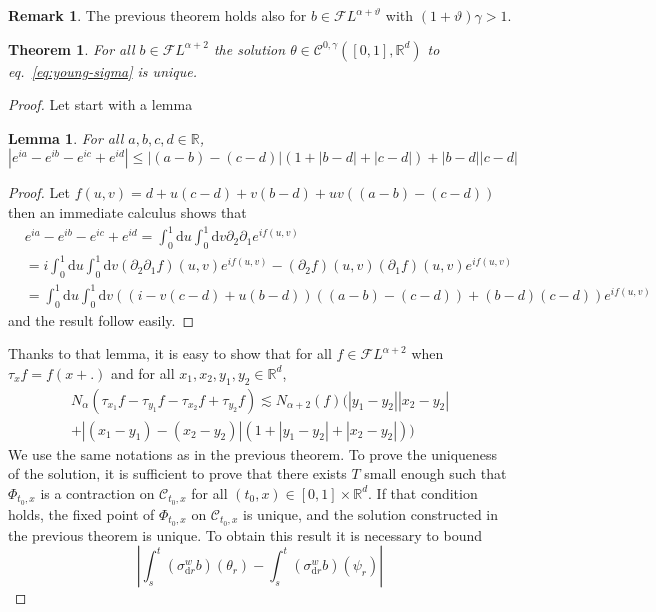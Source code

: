 \documentclass[11pt,a4paper,draft,reqno]{amsart}
\newtheorem{lemma}{Lemma}
\newtheorem{theorem}{Theorem}
\theoremstyle{definition}
\newtheorem{remark}{Remark}
\newcommand{\RR}{\mathbb{R}}
\newcommand{\cF}{\mathcal{F}}
\newcommand{\dd}{\mathrm{d}}
\newcommand{\cC}{\mathcal{C}}
\begin{document}
%
\begin{remark}
The previous theorem holds also for $b \in \cF L^{\alpha+\vartheta}$ with $(1+\vartheta)\gamma > 1$.
\end{remark}
%
\begin{theorem}
For all $b\in\cF L^{\alpha+2}$ the solution $\theta\in \cC^{0,\gamma}([0,1],\RR^d)$ to eq.~\eqref{eq:young-sigma} is unique. 
\end{theorem}
%
\begin{proof}
Let start with a lemma 
\begin{lemma}\label{lemma quadriangulation}
For all $a,b,c,d\in\RR$,
$$\left|e^{ia}-e^{ib}-e^{ic}+e^{id}\right|\le|(a-b)-(c-d)|(1+|b-d|+|c-d|)+|b-d||c-d|$$
\end{lemma}
\begin{proof}
Let $f(u,v)=d+u(c-d)+v(b-d)+uv((a-b)-(c-d))$
then an immediate calculus shows that
\begin{equation*}
\begin{split}
& e^{ia}-e^{ib}-e^{ic}+e^{id}  =
\int_{0}^1\dd u \int_{0}^1\dd v \partial_2\partial_1 e^{if(u,v)}
\\  & =
i\int_{0}^1\dd u \int_{0}^1\dd v (\partial_2\partial_1 f)(u,v)e^{if(u,v)} - (\partial_2f)(u,v)(\partial_1 f)(u,v)e^{if(u,v)}
\\ & =
\int_{0}^1\dd u \int_{0}^1\dd v \left(\left(i - v(c-d)+u(b-d)\right)((a-b)-(c-d))+ (b-d)(c-d)\right) e^{if(u,v)}
\end{split}
\end{equation*}
and the result follow easily.
\end{proof}
Thanks to that lemma, it is easy to show that for all $f\in\cF L^{\alpha+2}$ when $\tau_x f = f(x+.)$ and for all $x_1,x_2,y_1,y_2\in\RR^d$,
\begin{multline*}
N_{\alpha}\left(\tau_{x_1}f-\tau_{y_1}f-\tau_{x_2}f+\tau_{y_2}f\right)
\lesssim
N_{\alpha+2}(f)\Big(|y_1-y_2||x_2-y_2|\\
+|(x_1-y_1)-(x_2-y_2)|\left(1+|y_1-y_2|+|x_2-y_2|\right)
\Big)
\end{multline*}
We use the same notations as in the previous theorem. To prove the uniqueness of the solution, it is sufficient to prove that there exists $T$ small enough such that $\Phi_{t_0,x}$ is a contraction on $\cC_{t_0,x}$ for all $(t_0,x)\in [0,1]\times\RR^d$. If that condition holds, the fixed point of $\Phi_{t_0,x}$ on $\cC_{t_0,x}$ is unique, and the solution constructed in the previous theorem is unique. To obtain this result it is necessary to bound
$$\left|\int_{s}^t\left(\sigma_{\dd r}^w b\right)(\theta_r)-\int_{s}^t\left(\sigma_{\dd r}^w b\right)(\psi_r)\right|$$

\end{proof}
\end{document}
